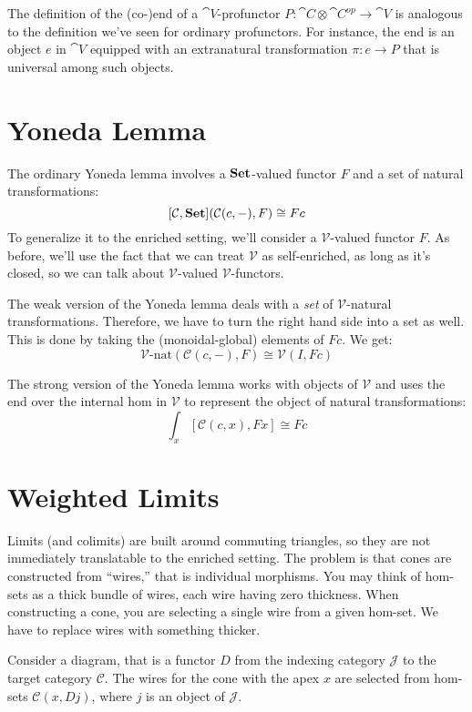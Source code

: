 \documentclass[DaoFP]{subfiles}
\begin{document}
The definition of the (co-)end of a $\cat V$-profunctor $P \colon \cat C \otimes \cat C^{op} \to \cat V$ is analogous to the definition we've seen for ordinary profunctors. For instance, the end is an object $e$ in $\cat V$ equipped with an extranatural transformation $\pi \colon e \to P$ that is universal among such objects. 

\section{Yoneda Lemma}

The ordinary Yoneda lemma involves a $\mathbf{Set}$-valued functor $F$ and a set of natural transformations:
\[ [\mathcal C, \mathbf{Set}]( \mathcal C(c, -), F) \cong F c \]
To generalize it to the enriched setting, we'll consider a $\mathcal V$-valued functor $F$. As before, we'll use the fact that we can treat $\mathcal V$ as self-enriched, as long as it's closed, so we can talk about $\mathcal V$-valued $\mathcal V$-functors. 

The weak version of the Yoneda lemma deals with a \emph{set} of $\mathcal V$-natural transformations. Therefore, we have to turn the right hand side into a set as well. This is done by taking the (monoidal-global) elements of $F c$. We get:
\[ \mathcal V\text{-nat} ( \mathcal C(c, -), F) \cong \mathcal V(I, F c) \]

The strong version of the Yoneda lemma works with objects of $\mathcal V$ and uses the end over the internal hom in $\mathcal V$ to represent the object of natural transformations:
\[ \int_x [\mathcal C( c, x), F x] \cong F c \]

\section{Weighted Limits}

Limits (and colimits) are built around commuting triangles, so they are not immediately translatable to the enriched setting. The problem is that cones are constructed from ``wires,'' that is individual morphisms. You may think of hom-sets as a thick bundle of wires, each wire having zero thickness. When constructing a cone, you are selecting a single wire from a given hom-set. We have to replace wires with something thicker.

Consider a diagram, that is a functor $D$ from the indexing category $\mathcal J$ to the target category $\mathcal C$. The wires for the cone with the apex $x$ are selected from hom-sets $\mathcal C(x, D j)$, where $j$ is an object of $\mathcal J$. 
\end{document}
